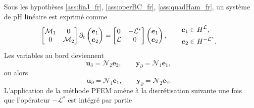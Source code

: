 Sous les hypothèses \ref{ass:linJ_fr}, \ref{ass:operBC_fr}, \ref{ass:quadHam_fr}, un système de pH linéaire est exprimé comme
\begin{equation*}
\begin{bmatrix}
\mathcal{M}_1 & 0 \\
0 & \mathcal{M}_2 \\
\end{bmatrix}
\partial_t \begin{pmatrix}
\bm{e}_1 \\ \bm{e}_2
\end{pmatrix} = \begin{bmatrix}
0 & - \mathcal{L}^* \\
\mathcal{L} & 0 \\
\end{bmatrix}\begin{pmatrix}
\bm{e}_1 \\ \bm{e}_2
\end{pmatrix} , \qquad \begin{aligned}
\bm{e}_1 &\in H^{\mathcal{L}}, 	\\
\bm{e}_2 &\in H^{-\mathcal{L}^*}.
\end{aligned}\\
\end{equation*}
Les variables au bord deviennent
\begin{equation*}
\bm{u}_\partial = \mathcal{N}_2 \displaystyle \bm{e}_2, \qquad  \bm{y}_\partial = \mathcal{N}_1 \displaystyle \bm{e}_1, 
\end{equation*}
ou alors
\begin{equation*}
\bm{u}_\partial = \mathcal{N}_1 \displaystyle \bm{e}_1, \qquad 
\bm{y}_\partial = \mathcal{N}_2 \displaystyle \bm{e}_2. 
\end{equation*}
L'application de la méthode PFEM amène à la discrétisation suivante une fois que l'opérateur $-\mathcal{L}^*$ est intégré par partie
